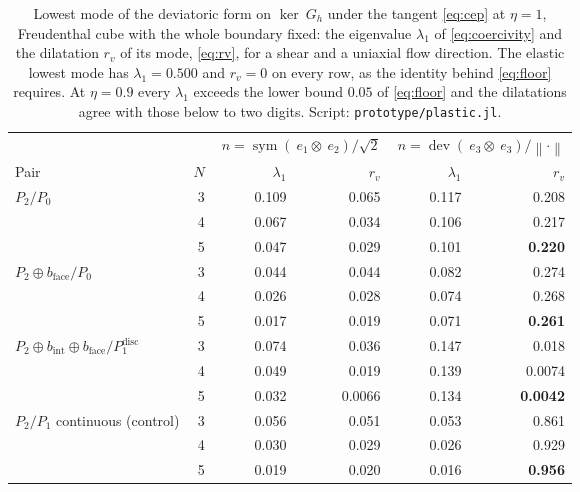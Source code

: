 \documentclass{article}
\newcommand{\dev}{\operatorname{dev}}
\newcommand{\sym}{\operatorname{sym}}
\newcommand{\norm}[1]{\left\lVert #1 \right\rVert}
\newcommand{\code}[1]{\texttt{#1}}
\theoremstyle{definition}
\theoremstyle{plain}
\begin{document}
\begin{table}[tbp]
\centering
\caption{Lowest mode of the deviatoric form on $\ker ~G_h$ under the tangent
\eqref{eq:cep} at $\eta = 1$, Freudenthal cube with the whole boundary fixed: the eigenvalue
$\lambda_1$ of \eqref{eq:coercivity} and the dilatation $r_v$ of its mode,
\eqref{eq:rv}, for a shear and a uniaxial flow direction. The elastic lowest
mode has $\lambda_1 = 0.500$ and $r_v = 0$ on every row, as the identity
behind \eqref{eq:floor} requires. At $\eta = 0.9$ every $\lambda_1$ exceeds
the lower bound $0.05$ of \eqref{eq:floor} and the dilatations agree with those below to two digits.
Script: \code{prototype/plastic.jl}.}
\label{tab:plastic}
\begin{tabular}{@{}lrrrrr@{}}
\toprule
& & \multicolumn{2}{c}{$~n = \sym(~e_1 \otimes ~e_2)/\sqrt2$}
  & \multicolumn{2}{c}{$~n = \dev(~e_3 \otimes ~e_3)/\norm{\cdot}$} \\
\cmidrule(lr){3-4}\cmidrule(lr){5-6}
Pair & $N$ & $\lambda_1$ & $r_v$ & $\lambda_1$ & $r_v$ \\
\midrule
$P_2/P_0$                       & 3 & 0.109  & 0.065  & 0.117 & 0.208 \\
                                & 4 & 0.067  & 0.034  & 0.106 & 0.217 \\
                                & 5 & 0.047  & 0.029  & 0.101 & \textbf{0.220} \\
$P_2 \oplus b_{\mathrm{face}}/P_0$
                                & 3 & 0.044  & 0.044  & 0.082 & 0.274 \\
                                & 4 & 0.026  & 0.028  & 0.074 & 0.268 \\
                                & 5 & 0.017  & 0.019  & 0.071 & \textbf{0.261} \\
$P_2 \oplus b_{\mathrm{int}} \oplus b_{\mathrm{face}}/P_1^{\mathrm{disc}}$
                                & 3 & 0.074  & 0.036  & 0.147 & 0.018 \\
                                & 4 & 0.049  & 0.019  & 0.139 & 0.0074 \\
                                & 5 & 0.032  & 0.0066 & 0.134 & \textbf{0.0042} \\
$P_2/P_1$ continuous (control)  & 3 & 0.056  & 0.051  & 0.053 & 0.861 \\
                                & 4 & 0.030  & 0.029  & 0.026 & 0.929 \\
                                & 5 & 0.019  & 0.020  & 0.016 & \textbf{0.956} \\
\bottomrule
\end{tabular}
\end{table}
\end{document}
